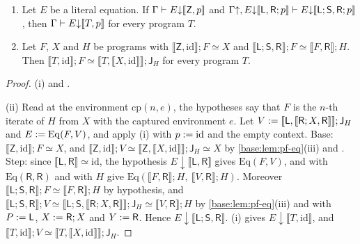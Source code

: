 \begin{lemma}
\label{base:lem:pf-uniq}
\begin{enumerate}[label=\textup{(\roman*)}]
\item Let $E$ be a literal equation.  If
 $\Gamma\vdash E{\downarrow}[\![\mathsf Z,p]\!]$ and
 $\Gamma{\uparrow},E{\downarrow}[\![\mathsf L,\mathsf R;p]\!]
 \vdash E{\downarrow}[\![\mathsf L;\mathsf S,\mathsf R;p]\!]$,
 then $\Gamma\vdash E{\downarrow}[\![ T,p]\!]$ for every
 program $T$.
\item Let $F$, $X$ and $H$ be programs with
 $\llbracket\mathsf Z,\mathrm{id}\rrbracket;F\simeq X$ and
 $\llbracket\mathsf L;\mathsf S,\mathsf R\rrbracket;F\simeq
 \llbracket F,\mathsf R\rrbracket;H$.  Then
 $\llbracket T,\mathrm{id}\rrbracket;F\simeq
 \llbracket T,\llbracket X,\mathrm{id}\rrbracket\rrbracket;\mathsf J_H$ for
 every program $T$.
\end{enumerate}
\end{lemma}

\begin{proof}
(i)  and .

(ii) Read at the environment $\mathrm{cp}(n,e)$, the hypotheses say that
$F$ is the $n$-th iterate of $H$ from $X$ with the captured environment
$e$.  Let
$V\mathrel{:=}[\![\mathsf L,[\![\mathsf R;X,\mathsf R]\!]]\!];
\mathsf J_H$ and $E\mathrel{:=}\mathrm{Eq}(F,V)$, and apply (i) with
$p\mathrel{:=}\mathrm{id}$ and the empty context.  Base:
$\llbracket\mathsf Z,\mathrm{id}\rrbracket;F\simeq X$, and
$\llbracket\mathsf Z,\mathrm{id}\rrbracket;V\simeq
\llbracket\mathsf Z,\llbracket X,\mathrm{id}\rrbracket\rrbracket;\mathsf J_H
\simeq X$ by \cref{base:lem:pf-eq}(iii) and .  Step: since
$\llbracket\mathsf L,\mathsf R\rrbracket\simeq\mathrm{id}$, the hypothesis
$E{\downarrow}\llbracket\mathsf L,\mathsf R\rrbracket$ gives
$\mathrm{Eq}(F,V)$, and  with $\mathrm{Eq}(\mathsf R,\mathsf R)$
and  with $H$ give
$\mathrm{Eq}(\llbracket F,\mathsf R\rrbracket;H,\ \llbracket V,\mathsf R\rrbracket;H)$.
Moreover
$\llbracket\mathsf L;\mathsf S,\mathsf R\rrbracket;F\simeq\llbracket F,\mathsf R\rrbracket;H$
by hypothesis, and
$\llbracket\mathsf L;\mathsf S,\mathsf R\rrbracket;V\simeq
\llbracket\mathsf L;\mathsf S,\llbracket\mathsf R;X,\mathsf R\rrbracket\rrbracket;
\mathsf J_H\simeq\llbracket V,\mathsf R\rrbracket;H$ by
\cref{base:lem:pf-eq}(iii) and  with $P\mathrel{:=}\mathsf L$,
$X\mathrel{:=}\mathsf R;X$ and $Y\mathrel{:=}\mathsf R$.  Hence
$E{\downarrow}\llbracket\mathsf L;\mathsf S,\mathsf R\rrbracket$.  (i) gives
$E{\downarrow}\llbracket T,\mathrm{id}\rrbracket$, and
$\llbracket T,\mathrm{id}\rrbracket;V\simeq
\llbracket T,\llbracket X,\mathrm{id}\rrbracket\rrbracket;\mathsf J_H$.
\end{proof}

